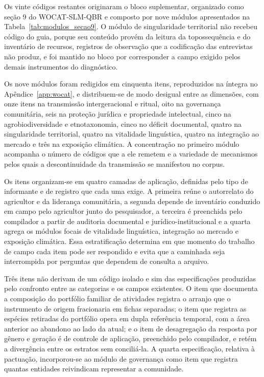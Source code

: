 \documentclass[preprint,authoryear,12pt]{elsarticle}
\begin{document}
Os vinte códigos restantes originaram o bloco suplementar, organizado como seção 9 do WOCAT-SLM-QBR e composto por nove módulos apresentados na Tabela~\ref{tab:modulos_secao9}. O módulo de singularidade territorial não recebeu código do guia, porque seu conteúdo provém da leitura da topossequência e do inventário de recursos, registros de observação que a codificação das entrevistas não produz, e foi mantido no bloco por corresponder a campo exigido pelos demais instrumentos do diagnóstico.

Os nove módulos foram redigidos em cinquenta itens, reproduzidos na íntegra no Apêndice~\ref{app:wocat}, e distribuem-se de modo desigual entre as dimensões, com onze itens na transmissão intergeracional e ritual, oito na governança comunitária, seis na proteção jurídica e propriedade intelectual, cinco na agrobiodiversidade e etnotaxonomia, cinco no déficit documental, quatro na singularidade territorial, quatro na vitalidade linguística, quatro na integração ao mercado e três na exposição climática. A concentração no primeiro módulo acompanha o número de códigos que a ele remetem e a variedade de mecanismos pelos quais a descontinuidade da transmissão se manifestou no corpus.

Os itens organizam-se em quatro camadas de aplicação, definidas pelo tipo de informante e de registro que cada uma exige. A primeira reúne o autorrelato do agricultor e da liderança comunitária, a segunda depende de inventário conduzido em campo pelo agricultor junto do pesquisador, a terceira é preenchida pelo compilador a partir de auditoria documental e jurídico-institucional e a quarta agrega os módulos focais de vitalidade linguística, integração ao mercado e exposição climática. Essa estratificação determina em que momento do trabalho de campo cada item pode ser respondido e evita que a caminhada seja interrompida por perguntas que dependem de consulta a arquivo.

Três itens não derivam de um código isolado e sim das especificações produzidas pelo confronto entre as categorias e os campos existentes. O item que documenta a composição do portfólio familiar de atividades registra o arranjo que o instrumento de origem fracionaria em fichas separadas; o item que registra as espécies retiradas do portfólio opera em dupla referência temporal, com a área anterior ao abandono ao lado da atual; e o item de desagregação da resposta por gênero e geração é de controle de aplicação, preenchido pelo compilador, e retém a divergência entre os estratos sem conciliá-la. A quarta especificação, relativa à pactuação, incorporou-se ao módulo de governança como item que registra quantas entidades reivindicam representar a comunidade.
\end{document}
